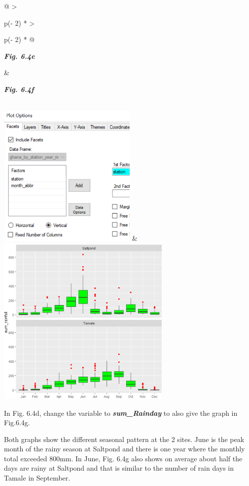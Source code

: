 \documentclass[
  letterpaper,
  DIV=11,
  numbers=noendperiod]{scrreprt}
\begin{document}
\begin{longtable}[]{@{}
  >{\raggedright\arraybackslash}p{(\columnwidth - 2\tabcolsep) * }
  >{\raggedright\arraybackslash}p{(\columnwidth - 2\tabcolsep) * }@{}}
\toprule\noalign{}
\begin{minipage}[b]{\linewidth}\raggedright
\textbf{\emph{Fig. 6.4e}}
\end{minipage} & \begin{minipage}[b]{\linewidth}\raggedright
\textbf{\emph{Fig. 6.4f}}
\end{minipage} \\
\midrule\noalign{}
\endhead
\bottomrule\noalign{}
\endlastfoot
\includegraphics[width=2.65815in,height=2.73552in]{figures/Fig6.4e.png}
&
\includegraphics[width=3.32867in,height=3.28715in]{figures/Fig6.4f.png} \\
\end{longtable}

In Fig. 6.4d, change the variable to \textbf{\emph{sum\_Rainday}} to
also give the graph in Fig.6.4g.

Both graphs show the different seasonal pattern at the 2 sites. June is
the peak month of the rainy season at Saltpond and there is one year
where the monthly total exceeded 800mm. In June, Fig. 6.4g also shows on
average about half the days are rainy at Saltpond and that is similar to
the number of rain days in Tamale in September.
\end{document}
